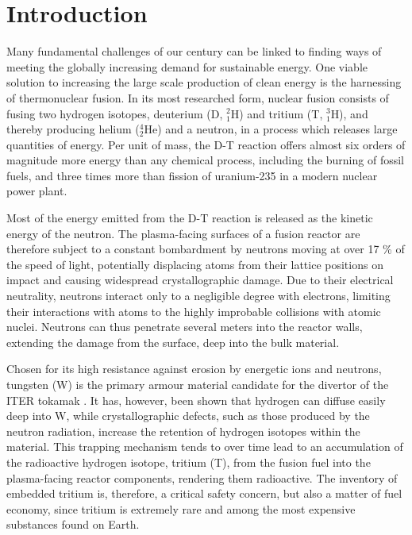 \chapter{Introduction}

Many fundamental challenges of our century can be linked to finding ways of meeting the globally increasing demand for sustainable energy. 
One viable solution to increasing the large scale production of clean energy is the harnessing of thermonuclear fusion. 
In its most researched form, nuclear fusion consists of fusing two hydrogen isotopes, deuterium (D, $^2_1$H) and tritium (T, $^3_1$H), and thereby producing helium ($^4_2$He) and a neutron, in a process which releases large quantities of energy. 
Per unit of mass, the D-T reaction offers almost six orders of magnitude more energy than any chemical process, including the burning of fossil fuels, and three times more than fission of uranium-235 in a modern nuclear power plant.  

Most of the energy emitted from the D-T reaction is released as the kinetic energy of the neutron. 
The plasma-facing surfaces of a fusion reactor are therefore subject to a constant bombardment by neutrons moving at over 17 \% of the speed of light, potentially displacing atoms from their lattice positions on impact and causing widespread crystallographic damage. 
Due to their electrical neutrality, neutrons interact only to a negligible degree with electrons, limiting their interactions with atoms to the highly improbable collisions with atomic nuclei. 
Neutrons can thus penetrate several meters into the reactor walls, extending the damage from the surface, deep into the bulk material. 

Chosen for its high resistance against erosion by energetic ions and neutrons, tungsten (W) is the primary armour material candidate for the divertor of the ITER tokamak \cite{hirai2013iter}. %
It has, however, been shown that hydrogen can diffuse easily deep into W, while crystallographic defects, such as those produced by the neutron radiation, increase the retention of hydrogen isotopes within the material. \cite{tanabe2014review} 
This trapping mechanism tends to over time lead to an accumulation of the radioactive hydrogen isotope, tritium (T), from the fusion fuel into the plasma-facing reactor components, rendering them radioactive. 
The inventory of embedded tritium is, therefore, a critical safety concern, but also a matter of fuel economy, since tritium is extremely rare and among the most expensive substances found on Earth.

